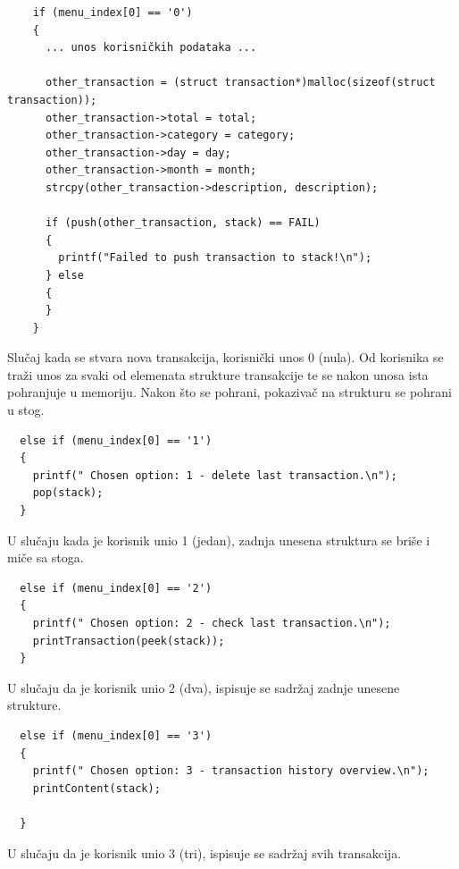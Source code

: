 \documentclass[12pt, letterpaper]{article}
\begin{document}
  \begin{verbatim}
    if (menu_index[0] == '0')
    {
      ... unos korisničkih podataka ...

      other_transaction = (struct transaction*)malloc(sizeof(struct transaction));
      other_transaction->total = total;
      other_transaction->category = category;
      other_transaction->day = day;
      other_transaction->month = month;
      strcpy(other_transaction->description, description);

      if (push(other_transaction, stack) == FAIL)
      {
        printf("Failed to push transaction to stack!\n");
      } else
      {
      }
    }
  \end{verbatim}
  Slučaj kada se stvara nova transakcija, korisnički unos 0 (nula). Od korisnika se traži unos za svaki od elemenata strukture transakcije te se nakon unosa ista pohranjuje u memoriju. Nakon što se pohrani, pokazivač na strukturu se pohrani u stog.

  \begin{verbatim}
  else if (menu_index[0] == '1')
  {
    printf(" Chosen option: 1 - delete last transaction.\n");
    pop(stack);
  }
  \end{verbatim}
U slučaju kada je korisnik unio 1 (jedan), zadnja unesena struktura se briše i miče sa stoga.

  \begin{verbatim}
  else if (menu_index[0] == '2')
  {
    printf(" Chosen option: 2 - check last transaction.\n");
    printTransaction(peek(stack));
  }  
  \end{verbatim}
  U slučaju da je korisnik unio 2 (dva), ispisuje se sadržaj zadnje unesene strukture.


  \begin{verbatim}
  else if (menu_index[0] == '3')
  {
    printf(" Chosen option: 3 - transaction history overview.\n");
    printContent(stack);

  }     
  \end{verbatim}
  U slučaju da je korisnik unio 3 (tri), ispisuje se sadržaj svih transakcija.
\end{document}
